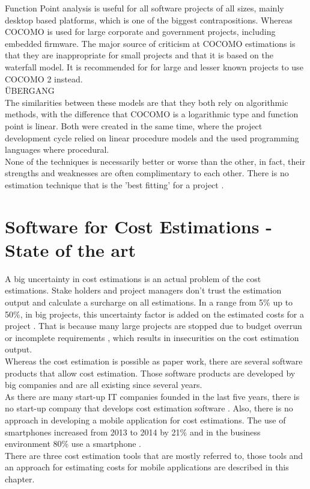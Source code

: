 Function Point analysis is useful for all software projects of all sizes, mainly desktop based platforms, which is one of the biggest contrapositions. Whereas COCOMO is used for large corporate and government projects, including embedded firmware. The major source of criticism at COCOMO estimations is that they are inappropriate for small projects and that it is based on the waterfall model. It is recommended for for large and lesser known projects to use COCOMO 2 instead.\\
ÜBERGANG \\
The similarities between these models are that they both rely on algorithmic methods, with the difference that COCOMO is a logarithmic type and function point is linear. Both were created in the same time, where the project development cycle relied on linear procedure models and the used programming languages where procedural.\\
None of the techniques is necessarily better or worse than the other, in fact, their strengths and weaknesses are often complimentary to each other. There is no estimation technique that is the 'best fitting' for a project \cite{estimationanalysis}.

\section{Software for Cost Estimations - State of the art}

A big uncertainty in cost estimations is an actual problem of the cost estimations. Stake holders and project managers don't trust the estimation output and calculate a surcharge on all estimations. In a range from 5\% up to 50\%, in big projects, this uncertainty factor is added on the estimated costs for a project \cite{fischer}. That is because many large projects are stopped due to budget overrun or incomplete requirements \cite{chaos}, which results in insecurities on the cost estimation output.\\  
Whereas the cost estimation is possible as paper work, there are several software products that allow cost estimation. Those software products are developed by big companies and are all existing since several years.\\
As there are many start-up IT companies founded in the last five years, there is no start-up company that develops cost estimation software \cite{dsm}. Also, there is no approach in developing a mobile application for cost estimations. The use of smartphones increased from 2013 to 2014 by 21\% and in the business environment 80\% use a smartphone \cite{faszinationmobile}.\\
There are three cost estimation tools that are mostly referred to, those tools and an approach for estimating costs for mobile applications are described in this chapter.\\

